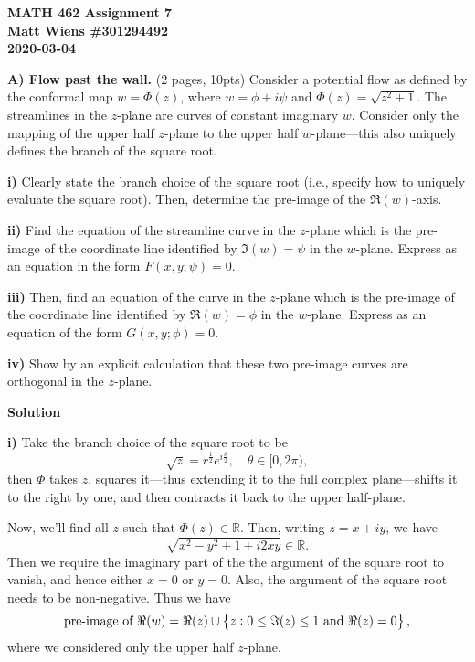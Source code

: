 \documentclass{article}
\newcommand{\R}{\mathbb{R}}
\begin{document}
\textbf{MATH 462 Assignment 7} \\
\textbf{Matt Wiens \#301294492} \\
\textbf{2020-03-04}

\textbf{A) Flow past the wall.} (2 pages, 10pts) Consider a potential
flow as defined by the conformal map $w = \Phi(z)$, where $w = \phi + i
\psi$ and $\Phi(z) = \sqrt{z^2 + 1}$. The streamlines in the $z$-plane
are curves of constant imaginary $w$. Consider only the mapping of the
upper half $z$-plane to the upper half $w$-plane---this also uniquely
defines the branch of the square root.

\textbf{i)} Clearly state the branch choice of the square root (i.e.,
specify how to uniquely evaluate the square root). Then, determine the
pre-image of the $\Re(w)$-axis.

\textbf{ii)} Find the equation of the streamline curve in the $z$-plane
which is the pre-image of the coordinate line identified by $\Im(w) =
\psi$ in the $w$-plane. Express as an equation in the form $F(x, y;
\psi) = 0$.

\textbf{iii)} Then, find an equation of the curve in the $z$-plane which
is the pre-image of the coordinate line identified by $\Re(w) = \phi$ in
the $w$-plane. Express as an equation of the form $G(x, y; \phi) = 0$.

\textbf{iv)} Show by an explicit calculation that these two pre-image
curves are orthogonal in the $z$-plane.

\newpage

\textbf{Solution}

\textbf{i)} Take the branch choice of the square root to be
%
\begin{equation*}
    \sqrt{z} = r^{\frac{1}{2}} e^{i \frac{\theta}{2}}, \quad \theta \in [0, 2 \pi)
    ,
\end{equation*}
%
then $\Phi$ takes $z$,
squares it---thus extending it to the full complex plane---shifts it to
the right by one, and then contracts it back to the upper half-plane.

Now, we'll find all $z$ such that $\Phi(z) \in \R$. Then, writing $z = x
+ i y$,  we have
%
\begin{equation*}
   \sqrt{x^2 - y^2 + 1 + i 2 x y} \in \R
   .
\end{equation*}
%
Then we require the imaginary part of the the argument of the square
root to vanish, and hence either $x = 0$ or $y = 0$. Also, the argument
of the square root needs to be non-negative. Thus we have
%
\begin{equation*}
    \text{pre-image of $\Re(w)$} = \Re(z)  \cup \cbr{z: 0 \leq \Im(z) \leq 1 \text{ and } \Re(z) = 0}
    ,
\end{equation*}
%
where we considered only the upper half $z$-plane.
\end{document}
